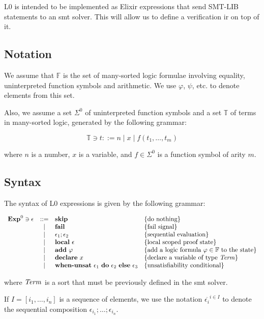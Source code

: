 L0 is intended to be implemented as Elixir expressions that send SMT-LIB 
statements to an \acrshort{smt} solver. This will allow us to define a
verification \gls{ir} on top of it.

\subsection{Notation}

We assume that $\mathbb{F}$ is the set of many-sorted logic formulae involving
equality, uninterpreted function symbols and arithmetic. We use $\varphi$, 
$\psi$, etc. to denote elements from this set.

Also, we assume a set $\Sigma^{0}$ of uninterpreted function symbols and a set
$\mathbb{T}$ of terms in many-sorted logic, generated by the following grammar:

\[
\mathbb{T} \ni t ::= n \mid x \mid f(t_1, \ldots, t_m)
\]

where $n$ is a number, $x$ is a variable, and $f \in \Sigma^{0}$ is a function 
symbol of arity $m$.

\subsection{Syntax}

The syntax of L0 expressions is given by the following grammar:

\[
\begin{array}{rcll}
\mathbf{Exp}^{0} \ni \epsilon & ::= & \textbf{skip} & \{ \textrm{do nothing} \}\\
& | & \textbf{fail} & \{ \textrm{fail signal} \}\\
& | & \epsilon_1;\epsilon_2 & \{ \textrm{sequential evaluation} \}\\
& | & \textbf{local}~\epsilon & \{ \textrm{local scoped proof state} \}\\
& | & \textbf{add}~\varphi &  \{ \textrm{add a logic formula $\varphi \in \mathbb{F}$ to the state} \}\\
& | & \textbf{declare}~x &  \{ \textrm{declare a variable of type $\mathit{Term}$} \}\\
& | & \textbf{when-unsat}~\epsilon_1~\textbf{do}~\epsilon_2~\textbf{else}~\epsilon_3 &  \{ \textrm{unsatisfiability conditional} \}\\
\end{array}
\]

where $\mathit{Term}$ is a sort that must be previously defined in the \acrshort{smt}
solver.

If $I = [i_1, \ldots, i_n]$ is a sequence of elements, we use the notation
$\overline{\epsilon_i}^{i \in I}$ to denote the sequential composition 
$\epsilon_{i_1};\dots;\epsilon_{i_n}$.

